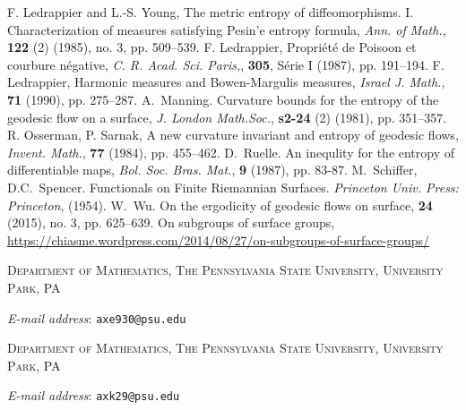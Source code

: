 \documentclass[12pt]{article}
\makeatletter
\numberwithin{equation}{section}
\theoremstyle{definition}
\newcommand{\Addresses}{{%
  \bigskip
  \footnotesize

  \textsc{Department of Mathematics, The Pennsylvania State University, University Park, PA}\par\nopagebreak
  \textit{E-mail address}: \texttt{axe930@psu.edu}
	
	\bigskip
	
	\textsc{Department of Mathematics, The Pennsylvania State University, University Park, PA}\par\nopagebreak
  \textit{E-mail address}: \texttt{axk29@psu.edu}
}}
\makeatother
\begin{document}
{\begin{thebibliography}{1}
 F. Ledrappier and L.-S. Young, The metric entropy of diffeomorphisms. I. Characterization of measures satisfying Pesin'e entropy formula, \textit{Ann. of Math.}, \textbf{122} (2) (1985), no. 3, pp. 509--539.
 F. Ledrappier, Propri\'et\'e de Poisoon et courbure n\'egative, \textit{C. R. Acad. Sci. Paris,}, \textbf{305}, S\'erie I (1987), pp. 191--194.
 F. Ledrappier, Harmonic measures and Bowen-Margulis measures, \textit{Israel J. Math.}, \textbf{71} (1990), pp. 275--287.
 A.~Manning. Curvature bounds for the entropy of the geodesic flow on a surface, \textit{J. London Math.Soc.}, \textbf{s2-24} (2) (1981), pp. 351--357.
 R. Osserman, P. Sarnak, A new curvature invariant and entropy of geodesic flows, \textit{Invent. Math.}, \textbf{77} (1984), pp. 455--462.
 D.~Ruelle. An inequlity for the entropy of differentiable maps, \textit{Bol. Soc. Bras. Mat.}, \textbf{9} (1987), pp. 83-87.
 M.~Schiffer, D.C.~Spencer. Functionals on Finite Riemannian Surfaces. \textit{Princeton Univ. Press: Princeton}, (1954).
 W.~Wu. On the ergodicity of geodesic flows on surface, \textbf{24} (2015), no. 3, pp. 625--639.
 On subgroups of surface groups, \href{https://chiasme.wordpress.com/2014/08/27/on-subgroups-of-surface-groups/}{https://chiasme.wordpress.com/2014/08/27/on-subgroups-of-surface-groups/}
\end{thebibliography}}
\Addresses
\end{document}
